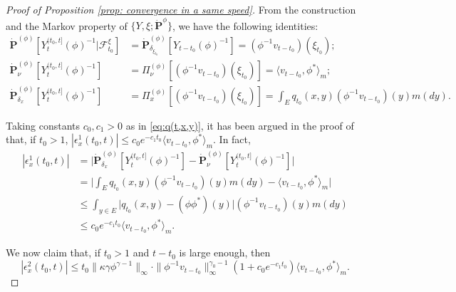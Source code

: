 \documentclass[12pt, a4paper]{amsart}
\theoremstyle{definition}
\numberwithin{equation}{section}
\begin{document}
\begin{proof}[Proof of Proposition \ref{prop: convergence in a same speed}]
	From the construction and the Markov property of $\{Y,\xi; \dot {\mathbf P}^{\phi}\}$, 
	 we have the following identities:
\[\label{eq: some equations for PY-1}\begin{split}
	\dot{\mathbf P}^{(\phi)} [Y_t^{(t_0,t]}(\phi)^{-1}|\mathscr F^\xi_{t_0}]
	&= \dot{\mathbf P}_{\delta_{\xi_{t_0}}}^{(\phi)}  [Y_{t-t_0}(\phi)^{-1}]
	= (\phi^{-1}v_{t-t_0})(\xi_{t_0});
	\\ \dot{\mathbf P}_\nu^{(\phi)}[Y_t^{(t_0,t]}(\phi)^{-1}]
	&= \Pi_{\nu}^{(\phi)}[(\phi^{-1}v_{t-t_0})(\xi_{t_0}) ]
	= \langle v_{t-t_0},\phi^* \rangle_m;
	\\ \dot{\mathbf P}_{\delta_x}^{(\phi)}[Y_t^{(t_0,t]}(\phi)^{-1}]
	&= \Pi_x^{(\phi)}[(\phi^{-1}v_{t-t_0})(\xi_{t_0}) ]
	=  \int_E  q_{t_0}(x,y)(\phi^{-1}v_{t-t_0})(y) m(dy).
\end{split}\]

	Taking constants $c_0, c_1>0$ as in \eqref{eq:q(t,x,y)}, 
	it has been argued in the proof of
	\cite[Lemma 5.3]{RenSongSun2017Spine} that, if $t_0>1$,
$
	|\epsilon_x^1(t_0,t)|
	\leq c_0 e^{-c_1 t_0}\langle v_{t-t_0},\phi^* \rangle_m .
$
	In fact,
\[\label{eq:epsilon-1}\begin{split}
	|\epsilon_x^1(t_0,t)|
	& = \big| \dot {\mathbf P}_{\delta_x}^{(\phi)} [Y^{(t_0,t]}_t(\phi)^{-1}] - \dot {\mathbf P}_\nu^{(\phi)} [Y^{(t_0,t]}_t(\phi)^{-1}] \big| \\
	& = \big|  \int_E  q_{t_0}(x,y)(\phi^{-1}v_{t-t_0})(y) m(dy) - \langle v_{t-t_0},\phi^* \rangle_m \big|\\
	& \leq \int_{y\in E} \big| q_{t_0}(x,y) - (\phi\phi^*)(y) \big| (\phi^{-1}v_{t-t_0})(y) m(dy)\\
	& \leq c_0 e^{-c_1 t_0}\langle v_{t-t_0},\phi^* \rangle_m .
\end{split}\]

	We now claim that, if $t_0 > 1$ and $t-t_0$ is large enough, then
\[\label{eq:upperbound_of_epsilon-2}
	|\epsilon_x^2(t_0,t)|
	\leq t_0\|\kappa\gamma\phi^{\gamma - 1}\|_{\infty} \cdot \|\phi^{-1}v_{t-t_0}\|^{\gamma_0-1}_\infty (1+c_0 e^{-c_1 t_0}) \langle v_{t-t_0},\phi^* \rangle_m.
\]
	

\end{proof}
\end{document}
